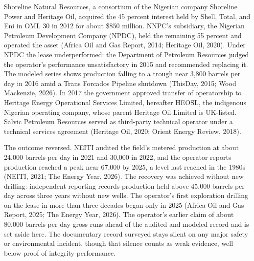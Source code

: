 \documentclass[twoside,fontset=lmodern]{mitthesis}
\begin{document}
Shoreline Natural Resources, a consortium of the Nigerian company
Shoreline Power and Heritage Oil, acquired the 45 percent interest held
by Shell, Total, and Eni in OML 30 in 2012 for about \$850 million.
NNPC's subsidiary, the Nigerian Petroleum Development Company (NPDC),
held the remaining 55 percent and operated the asset (Africa Oil and Gas
Report, 2014; Heritage Oil, 2020). Under NPDC the lease underperformed:
the Department of Petroleum Resources judged the operator's performance
unsatisfactory in 2015 and recommended replacing it. The modeled series
shows production falling to a trough near 3,800 barrels per day in 2016
amid a Trans Forcados Pipeline shutdown (ThisDay, 2015; Wood Mackenzie,
2026). In 2017 the government approved transfer of operatorship to
Heritage Energy Operational Services Limited, hereafter HEOSL, the
indigenous Nigerian operating company, whose parent Heritage Oil Limited
is UK-listed. Salvic Petroleum Resources served as third-party technical
operator under a technical services agreement (Heritage Oil, 2020;
Orient Energy Review, 2018).

The outcome reversed. NEITI audited the field's metered production at
about 24,000 barrels per day in 2021 and 30,000 in 2022, and the
operator reports production reached a peak near 67,000 by 2025, a level
last reached in the 1980s (NEITI, 2021; The Energy Year, 2026). The
recovery was achieved without new drilling: independent reporting
records production held above 45,000 barrels per day across three years
without new wells. The operator's first exploration drilling on the
lease in more than three decades began only in 2025 (Africa Oil and Gas
Report, 2025; The Energy Year, 2026). The operator's earlier claim of
about 80,000 barrels per day gross runs ahead of the audited and modeled
record and is set aside here. The documentary record surveyed stays
silent on any major safety or environmental incident, though that
silence counts as weak evidence, well below proof of integrity
performance.
\end{document}
